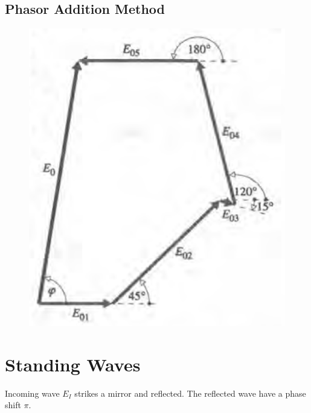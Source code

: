 \subsection{Phasor Addition Method}

\begin{figure}[H]
  \centering
  \includegraphics[width=0.7\linewidth]{figures/Phasor-Addition}
\end{figure}

\section{Standing Waves}

Incoming wave $E_{I}$ strikes a mirror and reflected. The reflected wave have a phase shift $\pi$.

